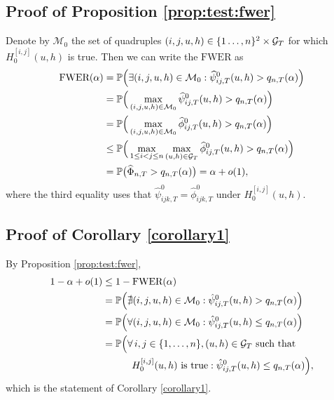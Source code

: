 \subsection*{Proof of Proposition \ref{prop:test:fwer}}\label{subsec:app:fwer}


Denote by $\mathcal{M}_0$ the set of quadruples $(i, j, u, h) \in \{1\ldots, n\}^2 \times \mathcal{G}_T$ for which $H_0^{[i, j]}(u, h)$ is true. Then we can write the $\text{FWER}$ as
\begin{align*}
\text{FWER}(\alpha)
 & = \mathbb{P} \Big( \exists (i,j,u, h) \in \mathcal{M}_0: \widehat{\psi}^0_{ij,T}(u, h) > q_{n, T}(\alpha) \Big) \\
 & = \mathbb{P} \Big( \max_{(i, j, u, h) \in \mathcal{M}_0} \widehat{\psi}^0_{ij,T}(u, h) > q_{n, T}(\alpha) \Big) \\
 & = \mathbb{P} \Big( \max_{(i,j,u, h) \in \mathcal{M}_0} \widehat{\phi}^0_{ij,T}(u, h) > q_{n, T}(\alpha) \Big) \\
 & \le \mathbb{P} \Big( \max_{1 \le i < j \le n} \max_{(u, h) \in \mathcal{G}_T} \widehat{\phi}_{ij,T}^0(u, h) > q_{n, T}(\alpha) \Big) \\
 & = \mathbb{P} \big( \widehat{\Phi}_{n, T} > q_{n, T}(\alpha) \big) = \alpha + o(1),
\end{align*}
where the third equality uses that $\hat{\psi}^0_{ijk,T} = \hat{\phi}^0_{ijk,T}$ under $H_0^{[i, j]}(u, h)$.



\subsection*{Proof of Corollary \ref{corollary1}}\label{subsec:app:corollary}


By Proposition \ref{prop:test:fwer}, 
\begin{align*}
1 - \alpha + o(1) 
 & \le 1 - \textnormal{FWER}(\alpha) \\
 & = \mathbb{P} \Big( \nexists (i,j,u, h) \in \mathcal{M}_0: \hat{\psi}^0_{ij,T}(u, h) > q_{n, T}(\alpha) \Big) \\
& = \mathbb{P}\Big( \forall (i,j,u, h) \in \mathcal{M}_0: \hat{\psi}^0_{ij,T}(u, h) \le q_{n, T}(\alpha) \Big)\\
&=\mathbb{P}\Big( \forall \, i,j \in \{1, \ldots, n\}, (u, h) \in \mathcal{G}_T \text{ such that }\\
&\quad\quad \quad H_0^{[i, j]}(u, h) \text{ is true}: \hat{\psi}^0_{ij,T}(u, h) \le q_{n,T}(\alpha) \Big),
\end{align*}
which is the statement of Corollary \ref{corollary1}.


